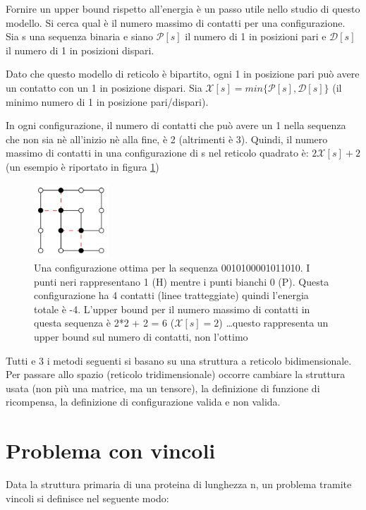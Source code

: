 \documentclass[conference]{IEEEtran}
\begin{document}
Fornire un upper bound rispetto all'energia è un passo utile nello studio di questo modello. Si cerca qual è il numero massimo di contatti per una configurazione. Sia s una sequenza binaria e siano $\mathcal{P}[s]$ il numero di 1 in posizioni pari e $\mathcal{D}[s]$ il numero di 1 in posizioni dispari.

Dato che questo modello di reticolo è bipartito, ogni 1 in posizione pari può avere un contatto con un 1 in posizione dispari. Sia $\mathcal{X}[s] = min\{\mathcal{P}[s], \mathcal{D}[s]\}$ (il minimo numero di 1 in posizione pari/dispari).

In ogni configurazione, il numero di contatti che può avere un 1 nella sequenza che non sia nè all'inizio nè alla fine, è 2 (altrimenti è 3). Quindi, il numero massimo di contatti in una configurazione di s nel reticolo quadrato è: $2 \mathcal{X}[s] + 2$ (un esempio è riportato in figura \ref{fig:optConfig})

\begin{figure}[h]
\centering
\includegraphics[width=0.25\textwidth]{figure/optConfig}
\caption{Una configurazione ottima per la sequenza 0010100001011010. I punti neri rappresentano 1 (H) mentre i punti bianchi 0 (P). Questa configurazione ha 4 contatti (linee tratteggiate) quindi l'energia totale è -4. L'upper bound per il numero massimo di contatti in questa sequenza è 2*2 + 2 = 6 ($\mathcal{X}[s] = 2$) \dots questo rappresenta un upper bound sul numero di contatti, non l'ottimo}
\label{fig:optConfig}
\end{figure}

Tutti e 3 i metodi seguenti si basano su una struttura a reticolo bidimensionale. Per passare allo spazio (reticolo tridimensionale) occorre cambiare la struttura usata (non più una matrice, ma un tensore), la definizione di funzione di ricompensa, la definizione di configurazione valida e non valida.

\section{Problema con vincoli}

Data la struttura primaria di una proteina di lunghezza n, un problema tramite vincoli si definisce nel seguente modo:
\end{document}

